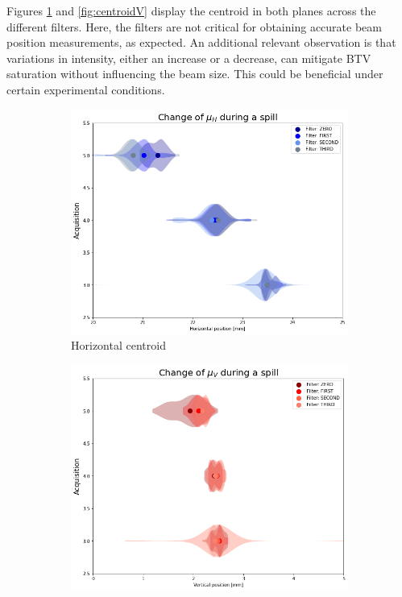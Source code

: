 Figures \ref{fig:centroidH} and \ref{fig:centroidV} display the centroid in both planes across the different filters. Here, the filters are not critical for obtaining accurate beam position measurements, as expected. An additional relevant observation is that variations in intensity, either an increase or a decrease, can mitigate BTV saturation without influencing the beam size. This could be beneficial under certain experimental conditions.
\\

\begin{figure}[htbp]
    \centering
    \begin{subfigure}[b]{0.49\textwidth}
        \centering
        \includegraphics[width=\textwidth]{03_Empirical_Measurements/images/muH.png}
        \caption{Horizontal centroid}
        \label{fig:centroidH}
    \end{subfigure}
    \hfill
    \begin{subfigure}[b]{0.49\textwidth}
        \centering
        \includegraphics[width=\textwidth]{03_Empirical_Measurements/images/muV.png}

\end{subfigure}
\end{figure}
